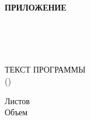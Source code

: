   \begin{flushright}
    \fontsize{16pt}{16pt}\selectfont
    \textbf{ПРИЛОЖЕНИЕ \VarGPRProgramTextAttachmentLetter} \enspace
  \end{flushright}
  
  \begin{center}
    \linespread{1.5}
    \fontsize{16pt}{16pt}\selectfont
    \envDiplomEducation \\
    \fontsize{14.5pt}{16pt}\selectfont
    \envDiplomUniversity \\
    \fontsize{16pt}{16pt}\selectfont
    \vspace{1.5em}
    \envDiplomCathedra \\
  \end{center}

  \vfill

  \begin{center}
    \envDiplomTitleUppercased
  \end{center}


  \begin{center}
    ТЕКСТ ПРОГРАММЫ \\
    (\envGPRProgramTextMedia)
  \end{center}

  \begin{center}
    \fontsize{16pt}{16pt}\selectfont
    \textbf{\envCode}
  \end{center}

  \vspace{2.5em}

  \begin{addmargin}[9cm]{0em}
    \fontsize{16pt}{16pt}\selectfont
    Листов \pageref{LastPage} \\
    Объем \envGPRProgramTextSize
  \end{addmargin}

  \vspace{2.5em}

  

  \vfill

  \begin{center}
    \ESKDtheYear
  \end{center}
